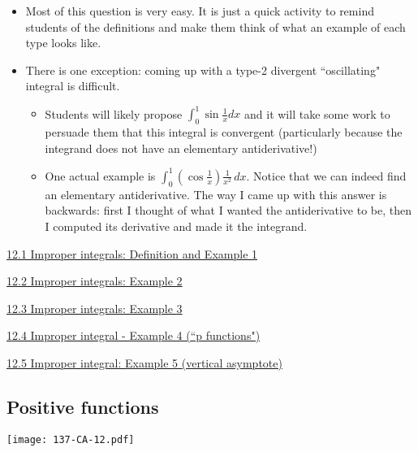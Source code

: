 \documentclass[11pt]{article}
\newcommand {\DS} [1] {${\displaystyle #1}$}
\newcommand{\nl}{\hfill \vspace{-1.1\baselineskip}} %
\newcommand{\vi}{\hspace{8mm} \href{https://www.youtube.com/watch?v=NqxwJ2D-Ckc&list=PLlwePzQY_wW-OVbBuwbFDl8RB5kt2Tngo}{12.1 Improper integrals: Definition and Example 1}}
\newcommand{\vii}{\hspace{8mm} \href{https://www.youtube.com/watch?v=L9wxtktioik&list=PLlwePzQY_wW-OVbBuwbFDl8RB5kt2Tngo&index=2}{12.2 Improper integrals: Example 2}}
\newcommand{\viii}{\hspace{8mm} \href{https://www.youtube.com/watch?v=pbr8GWBmLhU&list=PLlwePzQY_wW-OVbBuwbFDl8RB5kt2Tngo&index=3}{12.3 Improper integrals: Example 3}}
\newcommand{\viv}{\hspace{8mm} \href{https://www.youtube.com/watch?v=LVKdfkNyp58&list=PLlwePzQY_wW-OVbBuwbFDl8RB5kt2Tngo&index=4}{12.4 Improper integral - Example 4 (``p functions")
}}
\newcommand{\vv}{\hspace{8mm} \href{https://www.youtube.com/watch?v=l0bYj2g9qqM&list=PLlwePzQY_wW-OVbBuwbFDl8RB5kt2Tngo&index=5}{12.5 Improper integral: Example 5 (vertical asymptote)}}
\begin{document}
\begin{comments}
\nl
	\begin{itemize}
		\item Most of this question is very easy.  It is just a quick activity to remind students of the definitions and make them think of what an example of each type looks like.
		\item There is one exception: coming up with a type-2 divergent ``oscillating" integral is difficult.   
			\begin{itemize}
				\item  Students will likely propose \DS{\int_0^1 \sin \frac{1}{x} dx} and it will take some work to persuade them that this integral is convergent (particularly because the integrand does not have an elementary antiderivative!)
				\item One actual example is \DS{\int_0^1 \left( \cos \frac{1}{x} \right) \frac{1}{x^2} \, dx}.  Notice that we can indeed find an elementary antiderivative.  The way I came up with this answer is backwards: first I thought of what I wanted the antiderivative to be, then I computed its derivative and made it the integrand.
			\end{itemize}
	\end{itemize}
\end{comments}

\begin{videos}
\vi

\vii

\viii

\viv

\vv
\end{videos}

\newpage
\subsection{Positive functions}

\begin{center}
{ \texttt{[image: 137-CA-12.pdf]}} 
\end{center}
\end{document}
